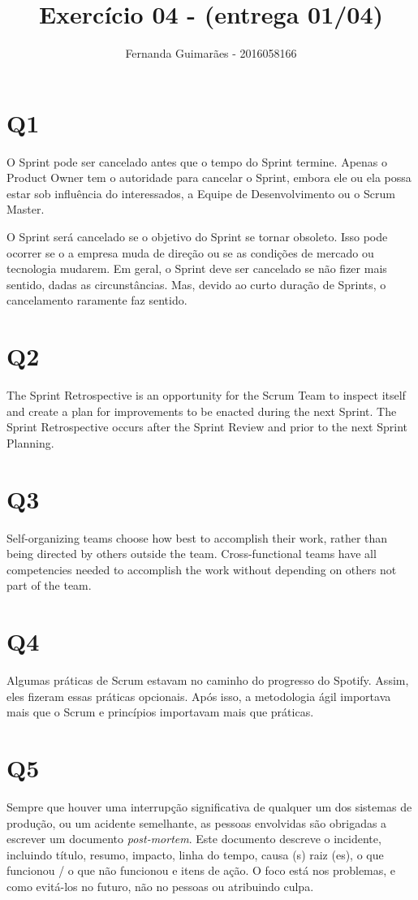 \documentclass[11pt]{article}
\author{Fernanda Guimarães - 2016058166}
\date{}
\title{Exercício 04 - (entrega 01/04)}
\begin{document}
\maketitle

\section{Q1}
\label{sec:org06e0f28}
O Sprint pode ser cancelado antes que o tempo do Sprint termine. Apenas o Product
Owner tem o autoridade para cancelar o Sprint, embora ele ou ela possa estar sob
influência do interessados, a Equipe de Desenvolvimento ou o Scrum Master.

O Sprint será cancelado se o objetivo do Sprint se tornar obsoleto. Isso pode ocorrer se o
a empresa muda de direção ou se as condições de mercado ou tecnologia mudarem. Em geral, o
Sprint deve ser cancelado se não fizer mais sentido, dadas as circunstâncias. Mas, devido
ao curto duração de Sprints, o cancelamento raramente faz sentido.

\section{Q2}
\label{sec:org7d4cea7}
The Sprint Retrospective is an opportunity for the Scrum Team to inspect itself and create
a plan for improvements to be enacted during the next Sprint.  The Sprint Retrospective
occurs after the Sprint Review and prior to the next Sprint Planning.

\section{Q3}
\label{sec:orgc69ac24}
Self-organizing teams choose how best to accomplish their work, rather than being
directed by others outside the team. Cross-functional teams have all competencies needed
to accomplish the work without depending on others not part of the team.

\section{Q4}
\label{sec:org274a209}
Algumas práticas de Scrum estavam no caminho do progresso do Spotify. Assim, eles
fizeram essas práticas opcionais. Após isso, a metodologia ágil importava mais que o
Scrum e princípios importavam mais que práticas.

\section{Q5}
\label{sec:org428b89f}
Sempre que houver uma interrupção significativa de qualquer um dos sistemas de produção,
ou um acidente semelhante, as pessoas envolvidas são obrigadas a escrever um documento
\emph{post-mortem}. Este documento descreve o incidente, incluindo título, resumo, impacto,
linha do tempo, causa (s) raiz (es), o que funcionou / o que não funcionou e itens de
ação. O foco está nos problemas, e como evitá-los no futuro, não no pessoas ou
atribuindo culpa.
\end{document}

